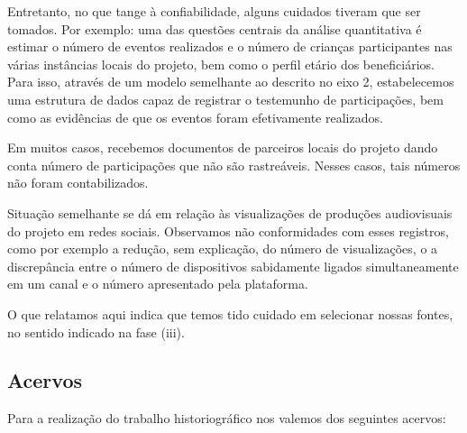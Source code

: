 \documentclass[
12pt,		%
openright,	%
twoside,  %
a4paper,			%
chapter=TITLE,		%
english,			%
french,				%
spanish,			%
brazil				%
]{USPSC-classe/USPSC}
\begin{document}
Entretanto, no que tange \`a confiabilidade, alguns cuidados tiveram que ser tomados. Por exemplo: uma das quest\~oes centrais da an\'alise quantitativa \'e estimar o n\'umero de eventos realizados e o n\'umero de crian\c{c}as participantes nas v\'arias inst\^ancias locais do projeto, bem como o perfil et\'ario dos benefici\'arios. Para isso, atrav\'es de um modelo semelhante ao descrito no eixo 2, estabelecemos uma estrutura de dados capaz de registrar o testemunho de participa\c{c}\~oes, bem como as evid\^encias de que os eventos foram efetivamente realizados.









Em muitos casos, recebemos documentos de parceiros locais do projeto dando conta n\'umero de participa\c{c}\~oes que n\~ao s\~ao rastre\'aveis. Nesses casos, tais n\'umeros n\~ao foram contabilizados.









Situa\c{c}\~ao semelhante se d\'a em rela\c{c}\~ao \`as visualiza\c{c}\~oes de produ\c{c}\~oes audiovisuais do projeto em redes sociais. Observamos n\~ao conformidades com esses registros, como por exemplo a redu\c{c}\~ao, sem explica\c{c}\~ao, do n\'umero de visualiza\c{c}\~oes, o a discrep\^ancia entre o n\'umero de dispositivos sabidamente ligados simultaneamente em um canal e o n\'umero apresentado pela plataforma.









O que relatamos aqui indica que temos tido cuidado em selecionar nossas fontes, no sentido indicado na fase (iii).









\subsection[Acervos]{Acervos}\label{Acervos}
Para a realiza\c{c}\~ao do trabalho historiogr\'afico nos valemos dos seguintes acervos:
\end{document}
